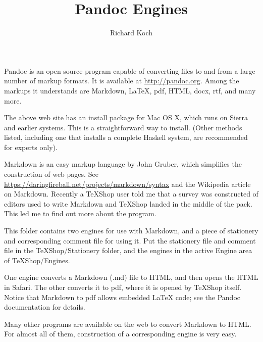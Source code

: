 \documentclass[11pt, oneside]{article}   	%
\title{Pandoc Engines}
\author{Richard Koch}
\begin{document}
\maketitle
Pandoc is an open source program capable of converting files to and from a large number of markup formats.
It is available at \url{http://pandoc.org}. Among the markups it understands are Markdown, LaTeX, pdf, HTML, docx, rtf, and many more.

The above web site has an install package for Mac OS X, which runs on Sierra and earlier systems. This is a straightforward way to install. (Other methods listed, including one that installs a complete Haskell system, are recommended for experts only).

Markdown is an  easy markup language by John Gruber, which simplifies the construction of web pages.
See \url{https://daringfireball.net/projects/markdown/syntax} and the Wikipedia article on Markdown. 
Recently a TeXShop user told me that a survey was constructed of editors used to write Markdown and TeXShop landed in the middle of the pack. This led me to find out more about the program.

This folder contains two engines for use with Markdown, and a piece of stationery and corresponding comment file for using it. Put the stationery file and comment file in the TeXShop/Stationery folder, and the engines in the active Engine area of TeXShop/Engines.

One engine converts a Markdown (.md) file to HTML, and then opens the HTML in Safari. The other converts it to pdf, where it is opened by TeXShop itself. Notice that Markdown to pdf allows embedded LaTeX code; see the Pandoc documentation for details.

Many other programs are available on the web to convert Markdown to HTML. For almost all of them, construction of a corresponding engine is very easy.
\end{document}
